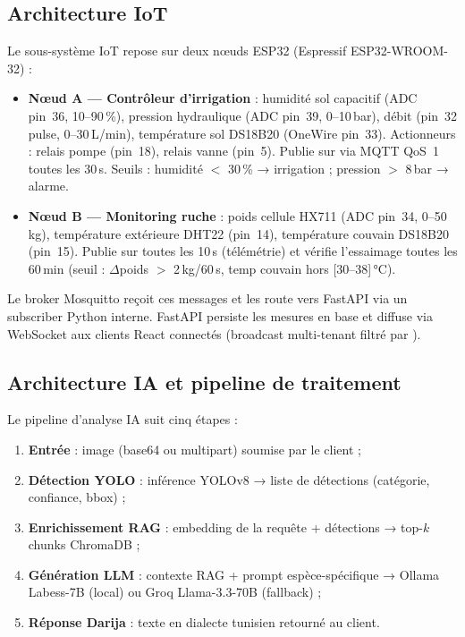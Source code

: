 \subsection{Architecture IoT}

Le sous-système IoT repose sur deux nœuds ESP32 (Espressif ESP32-WROOM-32) :
\begin{itemize}
  \item \textbf{Nœud A — Contrôleur d'irrigation} :
        humidité sol capacitif (ADC pin~36, 10--90\,\%), pression hydraulique
        (ADC pin~39, 0--10\,bar), débit (pin~32 pulse, 0--30\,L/min),
        température sol DS18B20 (OneWire pin~33).
        Actionneurs : relais pompe (pin~18), relais vanne (pin~5).
        Publie sur 
        via MQTT QoS~1 toutes les 30\,s.
        Seuils : humidité $<$ 30\,\% → irrigation ; pression $>$ 8\,bar → alarme.
  \item \textbf{Nœud B — Monitoring ruche} :
        poids cellule HX711 (ADC pin~34, 0--50\,kg),
        température extérieure DHT22 (pin~14),
        température couvain DS18B20 (pin~15).
        Publie sur 
        toutes les 10\,s (télémétrie) et vérifie l'essaimage toutes les 60\,min
        (seuil : $\Delta$poids $>$ 2\,kg/60\,s, temp couvain hors [30--38]\,°C).
\end{itemize}
Le broker Mosquitto reçoit ces messages et les route vers FastAPI via un
subscriber Python interne. FastAPI persiste les mesures en base et diffuse
via WebSocket aux clients React connectés (broadcast multi-tenant filtré
par ).

\subsection{Architecture IA et pipeline de traitement}

Le pipeline d'analyse IA suit cinq étapes :
\begin{enumerate}
  \item \textbf{Entrée} : image (base64 ou multipart) soumise par le client ;
  \item \textbf{Détection YOLO} : inférence YOLOv8 → liste de détections
        (catégorie, confiance, bbox) ;
  \item \textbf{Enrichissement RAG} : embedding de la requête +
        détections → top-$k$ chunks ChromaDB ;
  \item \textbf{Génération LLM} : contexte RAG + prompt espèce-spécifique →
        Ollama Labess-7B (local) ou Groq Llama-3.3-70B (fallback) ;
  \item \textbf{Réponse Darija} : texte en dialecte tunisien retourné au client.
\end{enumerate}

